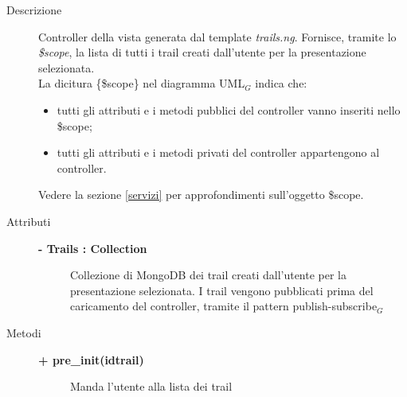 \begin{description}
\item[Descrizione] \hfill
	Controller della vista generata dal template \textit{trails.ng}. Fornisce, tramite lo \textit{\$scope}, la lista di tutti i trail creati dall'utente per la presentazione selezionata.
	\\ La dicitura \{\$scope\} nel diagramma UML$_G$ indica che:
\begin{itemize}
\item tutti gli attributi e i metodi pubblici del controller vanno inseriti nello \$scope;
\item tutti gli attributi e i metodi privati del controller appartengono al controller.
\end{itemize}
Vedere la sezione \ref{servizi} per approfondimenti sull'oggetto \$scope.
	

	
\item[Attributi] \hfill
	\begin{description}
		\item[\textbf{- Trails : Collection			}] \hfill
			Collezione di MongoDB dei trail creati dall'utente per la presentazione selezionata. I trail vengono pubblicati prima del caricamento del controller, tramite il pattern publish-subscribe$_G$
	\end{description}
	
	
\item[Metodi] \hfill

	\begin{description}
		\item[\textbf{\color{blue}+ pre\_init(idtrail)			}] \hfill
			Manda l'utente alla lista dei trail
	\end{description}	

\end{description}




